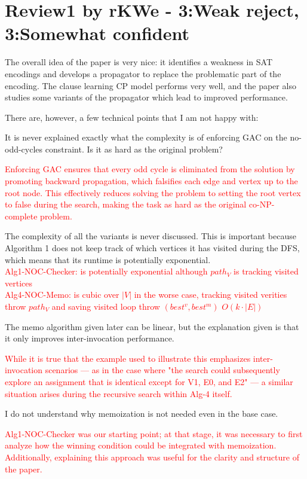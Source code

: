 \documentclass{article}
\begin{document}
\section*{Review1 by rKWe - 3:Weak reject,  3:Somewhat confident }
The overall idea of the paper is very nice: it identifies a weakness in SAT encodings and develops a propagator to replace the problematic part of the encoding. The clause learning CP model performs very well, and the paper also studies some variants of the propagator which lead to improved performance.

There are, however, a few technical points that I am not happy with:

It is never explained exactly what the complexity is of enforcing GAC on the no-odd-cycles constraint. Is it as hard as the original problem?

\textcolor{red}{ 
Enforcing GAC ensures that every odd cycle is eliminated from the solution by promoting backward propagation, which falsifies each edge and vertex up to the root node. This effectively reduces solving the problem to setting the root vertex to false during the search, making the task as hard as the original co-NP-complete problem.}

The complexity of all the variants is never discussed. This is important because Algorithm 1 does not keep track of which vertices it has visited during the DFS, which means that its runtime is potentially exponential.
\\
\textcolor{red}{
Alg1-NOC-Checker: is potentially exponential although $path_V$ is tracking visited vertices \\
Alg4-NOC-Memo: is cubic over $|V|$ in the worse case, tracking visited verities throw $path_V$ and saving visited loop throw $(best^v,best^m)$ $O(k \cdot |E|)$}

The memo algorithm given later can be linear, but the explanation given is that it only improves inter-invocation performance. 

\textcolor{red}{While it is true that the example used to illustrate this emphasizes inter-invocation scenarios — as in the case where "the search could subsequently explore an assignment that is identical except for V1, E0, and E2" — a similar situation arises during the recursive search within Alg-4 itself.}

I do not understand why memoization is not needed even in the base case.

\textcolor{red}{Alg1-NOC-Checker was our starting point; at that stage, it was necessary to first analyze how the winning condition could be integrated with memoization. Additionally, explaining this approach was useful for the clarity and structure of the paper.}
\end{document}
